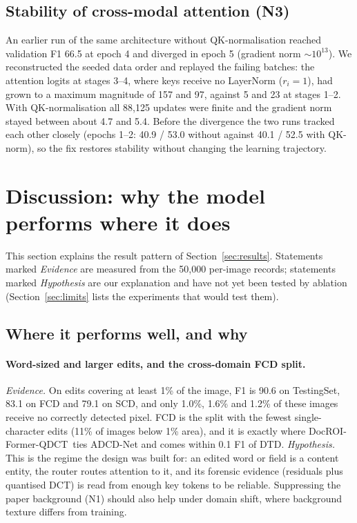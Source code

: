 \documentclass[11pt,a4paper]{article}
\newcommand{\ours}{DocROI-Former-QDCT}
\begin{document}
\subsection{Stability of cross-modal attention (N3)}\label{sec:stability}
An earlier run of the same architecture without QK-normalisation reached validation F1 66.5 at
epoch 4 and diverged in epoch 5 (gradient norm $\sim10^{13}$). We reconstructed the seeded data
order and replayed the failing batches: the attention logits at stages 3--4, where keys receive no
LayerNorm ($r_i=1$), had grown to a maximum magnitude of 157 and 97, against 5 and 23 at stages
1--2. With QK-normalisation all 88{,}125 updates were finite and the gradient norm stayed between
about 4.7 and 5.4. Before the divergence the two runs tracked each other closely (epochs 1--2:
40.9 / 53.0 without against 40.1 / 52.5 with QK-norm), so the fix restores stability without
changing the learning trajectory.

\section{Discussion: why the model performs where it does}\label{sec:discussion}

This section explains the result pattern of Section~\ref{sec:results}. Statements marked
\emph{Evidence} are measured from the 50{,}000 per-image records; statements marked
\emph{Hypothesis} are our explanation and have not yet been tested by ablation
(Section~\ref{sec:limits} lists the experiments that would test them).

\subsection{Where it performs well, and why}

\paragraph{Word-sized and larger edits, and the cross-domain FCD split.}
\emph{Evidence.} On edits covering at least 1\% of the image, F1 is 90.6 on TestingSet, 83.1 on
FCD and 79.1 on SCD, and only 1.0\%, 1.6\% and 1.2\% of these images receive no correctly detected
pixel. FCD is the split with the fewest single-character edits (11\% of images below 1\% area),
and it is exactly where \ours\ ties ADCD-Net and comes within 0.1 F1 of DTD.
\emph{Hypothesis.} This is the regime the design was built for: an edited word or field is a
content entity, the router routes attention to it, and its forensic evidence (residuals plus
quantised DCT) is read from enough key tokens to be reliable. Suppressing the paper background
(N1) should also help under domain shift, where background texture differs from training.
\end{document}
